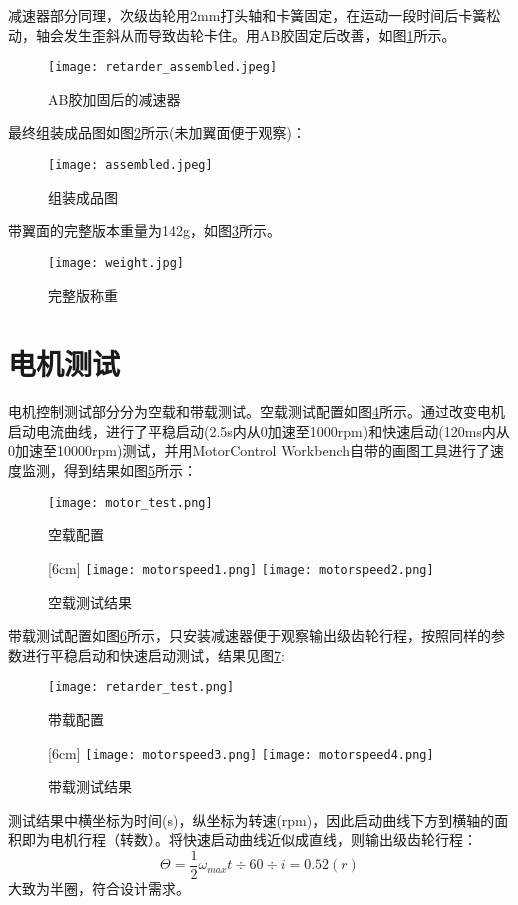 减速器部分同理，次级齿轮用2mm打头轴和卡簧固定，在运动一段时间后卡簧松动，轴会发生歪斜从而导致齿轮卡住。用AB胶固定后改善，如图\ref{fig:retarder_assembled}所示。
\begin{figure}[H]
  \centering%
  \texttt{[image: retarder\_assembled.jpeg]}
  \caption{AB胶加固后的减速器}
  \label{fig:retarder_assembled}
\end{figure}
最终组装成品图如图\ref{fig:assembled}所示(未加翼面便于观察)：
\begin{figure}[H]
  \centering%
  \texttt{[image: assembled.jpeg]}
  \caption{组装成品图}
  \label{fig:assembled}
\end{figure}
带翼面的完整版本重量为142g，如图\ref{fig:weight}所示。
\begin{figure}[H]
  \centering%
  \texttt{[image: weight.jpg]}
  \caption{完整版称重}
  \label{fig:weight}
\end{figure}
\section{电机测试}
电机控制测试部分分为空载和带载测试。空载测试配置如图\ref{fig:motor_test}所示。通过改变电机启动电流曲线，进行了平稳启动(2.5s内从0加速至1000rpm)和快速启动(120ms内从0加速至10000rpm)测试，并用MotorControl Workbench自带的画图工具进行了速度监测，得到结果如图\ref{fig:motor_test_speed}所示：

\begin{figure}[H]
  \centering%
  \texttt{[image: motor\_test.png]}
  \caption{空载配置}
  \label{fig:motor_test}
\end{figure}
\begin{figure}[H]
  \centering
  [6cm] 
    {\texttt{[image: motorspeed1.png]}}
  \hspace{4em}
      {\texttt{[image: motorspeed2.png]}}
  \caption{空载测试结果}
  \label{fig:motor_test_speed}
\end{figure}
带载测试配置如图\ref{fig:retarder_test}所示，只安装减速器便于观察输出级齿轮行程，按照同样的参数进行平稳启动和快速启动测试，结果见图\ref{fig:retarder_test_speed}:
\begin{figure}[H]
  \centering%
  \texttt{[image: retarder\_test.png]}
  \caption{带载配置}
  \label{fig:retarder_test}
\end{figure}
\begin{figure}[H]
  \centering
  [6cm] 
    {\texttt{[image: motorspeed3.png]}}
  \hspace{4em}
      {\texttt{[image: motorspeed4.png]}}
  \caption{带载测试结果}
  \label{fig:retarder_test_speed}
\end{figure}
测试结果中横坐标为时间(s)，纵坐标为转速(rpm)，因此启动曲线下方到横轴的面积即为电机行程（转数）。将快速启动曲线近似成直线，则输出级齿轮行程：$$\Theta=\frac{1}{2}\omega_{max}t\div60\div i=0.52(r)$$
大致为半圈，符合设计需求。
